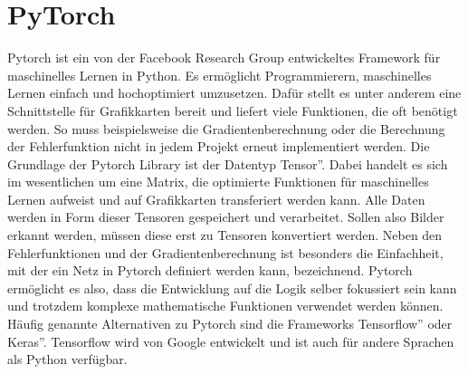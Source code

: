 \documentclass[11pt]{article}
\begin{document}
\section{PyTorch}
Pytorch ist ein von der Facebook Research Group entwickeltes Framework für maschinelles Lernen in Python. Es ermöglicht Programmierern, maschinelles Lernen einfach und hochoptimiert umzusetzen. Dafür stellt es unter anderem eine Schnittstelle für Grafikkarten bereit und liefert viele Funktionen, die oft benötigt werden. So muss beispielsweise die Gradientenberechnung oder die Berechnung der Fehlerfunktion nicht in jedem Projekt erneut implementiert werden. Die Grundlage der Pytorch Library ist der Datentyp \glqq Tensor''. Dabei handelt es sich im wesentlichen um eine Matrix, die optimierte Funktionen für maschinelles Lernen aufweist und auf Grafikkarten transferiert werden kann. Alle Daten werden in Form dieser Tensoren gespeichert und verarbeitet. Sollen also Bilder erkannt werden, müssen diese erst zu Tensoren konvertiert werden. Neben den Fehlerfunktionen und der Gradientenberechnung ist besonders die Einfachheit, mit der ein Netz in Pytorch definiert werden kann, bezeichnend. Pytorch ermöglicht es also, dass die Entwicklung auf die Logik selber fokussiert sein kann und trotzdem komplexe mathematische Funktionen verwendet werden können. Häufig genannte Alternativen zu Pytorch sind die Frameworks \glqq Tensorflow'' oder \glqq Keras''. Tensorflow wird von Google entwickelt und ist auch für andere Sprachen als Python verfügbar.
\end{document}
